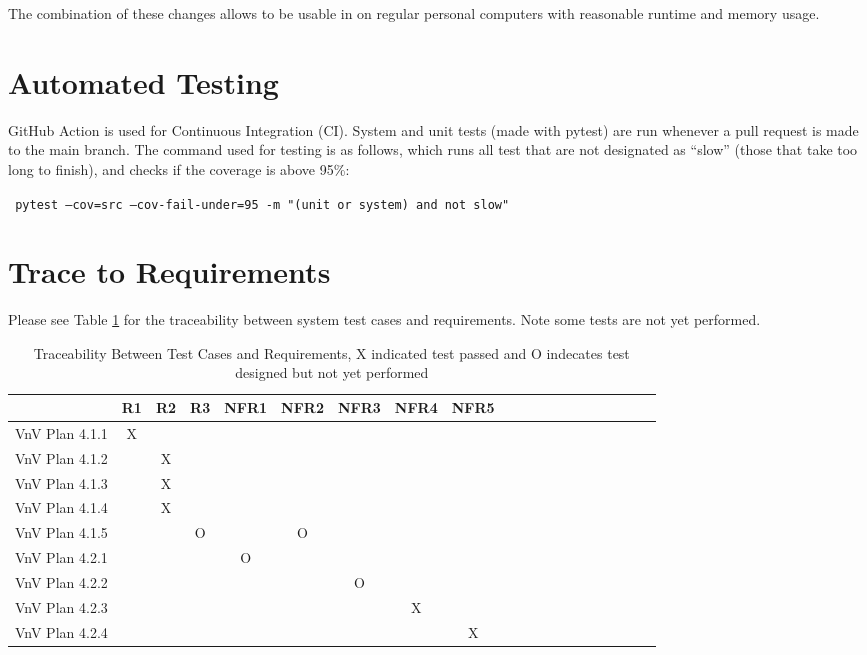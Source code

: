 \documentclass[12pt, titlepage]{article}
\begin{document}
The combination of these changes allows \progname{} to be usable in on regular personal computers with reasonable runtime and memory usage.

\section{Automated Testing} \label{sec:AutomatedTesting}

GitHub Action is used for Continuous Integration (CI). System and unit tests (made with pytest) are run whenever a pull request is made to the main branch. The command used for testing is as follows, which runs all test that are not designated as ``slow'' (those that take too long to finish), and checks if the coverage is above 95\%:

\texttt{ pytest --cov=src --cov-fail-under=95 -m "(unit or system) and not slow"}
		
\section{Trace to Requirements}
Please see Table \ref{Table:A_trace} for the traceability between system test cases and requirements. Note some tests are not yet performed.
\begin{table}[h!]
  \centering
  \begin{tabular}{|c|c|c|c|c|c|c|c|c|c|c|c|c|c|c|c|c|c|c|c|}
  \hline
                            & R1 & R2 & R3 & NFR1 & NFR2 & NFR3 & NFR4 & NFR5 \\
  \hline
  VnV Plan 4.1.1          & X  &    &    &      &      &      &      &      \\\hline
  VnV Plan 4.1.2          &    & X  &    &      &      &      &      &      \\\hline
  VnV Plan 4.1.3          &    & X  &    &      &      &      &      &      \\\hline
  VnV Plan 4.1.4          &    & X  &    &      &      &      &      &      \\\hline
  VnV Plan 4.1.5          &    &    & O  &      & O    &      &      &      \\\hline
  VnV Plan 4.2.1          &    &    &    & O    &      &      &      &      \\\hline
  VnV Plan 4.2.2          &    &    &    &      &      & O    &      &      \\\hline
  VnV Plan 4.2.3          &    &    &    &      &      &      & X    &      \\\hline
  VnV Plan 4.2.4          &    &    &    &      &      &      &      & X    \\\hline
  \end{tabular}
  \caption{Traceability Between Test Cases and Requirements, X indicated test passed and O indecates test designed but not yet performed}
  \label{Table:A_trace}
\end{table}
		
\end{document}
